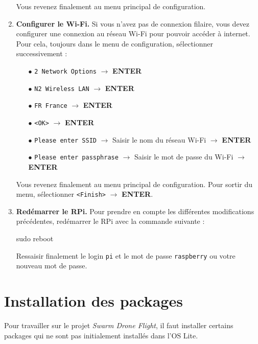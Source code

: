 \documentclass[a4paper, 10pt]{article}
\begin{document}
\begin{enumerate}
	Vous revenez finalement au menu principal de configuration.
	
	\item\textbf{Configurer le Wi-Fi.} Si vous n'avez pas de connexion
	filaire, vous devez configurer une connexion au réseau Wi-Fi pour
	pouvoir accéder à internet. Pour cela, toujours dans le menu de
	configuration, sélectionner successivement :

	\begin{itemize}
		\item[$\bullet$] \texttt{2 Network Options} 
						 $\rightarrow$ \textbf{ENTER}
		\item[$\bullet$] \texttt{N2 Wireless LAN}
						 $\rightarrow$ \textbf{ENTER}
		\item[$\bullet$] \texttt{FR France}
						 $\rightarrow$ \textbf{ENTER}
		\item[$\bullet$] \texttt{<OK>}
						 $\rightarrow$ \textbf{ENTER}
		\item[$\bullet$] \texttt{Please enter SSID}
						 $\rightarrow$ Saisir le nom du réseau Wi-Fi
						 $\rightarrow$ \textbf{ENTER}	
		\item[$\bullet$] \texttt{Please enter passphrase}
						 $\rightarrow$ Saisir le mot de passe du Wi-Fi
						 $\rightarrow$ \textbf{ENTER}		 		
	\end{itemize}
	
	Vous revenez finalement au menu principal de configuration.
	Pour sortir du menu, sélectionner \texttt{<Finish>}
	$\rightarrow$ \textbf{ENTER}.	

	\item\textbf{Redémarrer le RPi.} Pour prendre en compte les 
	différentes modifications précédentes, redémarrer le RPi avec
	la commande suivante :	
	
\begin{commandshell}
sudo reboot
\end{commandshell}	

	Ressaisir finalement le login \texttt{pi} et le mot de passe \texttt{raspberry} ou votre nouveau mot de passe. 
\end{enumerate}

\section{Installation des packages}

Pour travailler sur le projet \textit{Swarm Drone Flight}, il faut
installer certains packages qui ne sont pas initialement installés
dans l'OS Lite.
\end{document}
